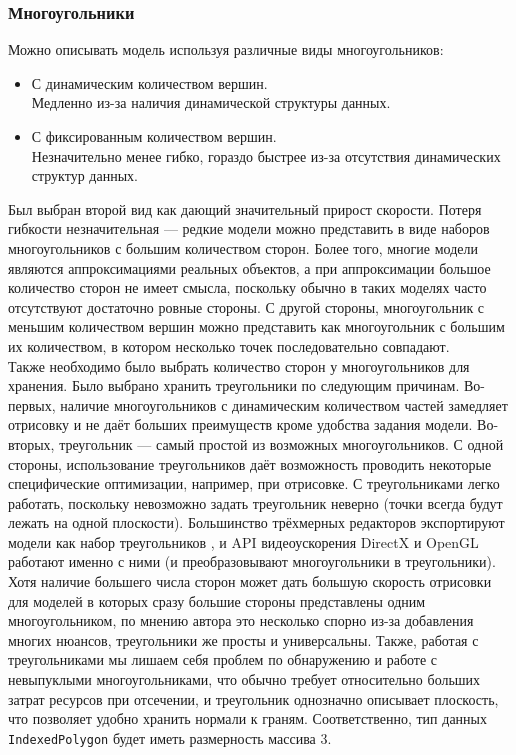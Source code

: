 \documentclass[a4paper,12pt]{report}
\numberwithin{equation}{section}
\begin{document}
\subsubsection{Многоугольники}
Можно описывать модель используя различные виды многоугольников:
\begin{itemize}
\item С динамическим количеством вершин. \\
Медленно из-за наличия динамической структуры данных.
\item С фиксированным количеством вершин. \\
Незначительно менее гибко, гораздо быстрее из-за отсутствия динамических структур данных.
\end{itemize}
Был выбран второй вид как дающий значительный прирост скорости. Потеря гибкости незначительная --- редкие модели можно представить в виде наборов многоугольников с большим количеством сторон. Более того, многие модели являются аппроксимациями реальных объектов, а при аппроксимации большое количество сторон не имеет смысла, поскольку обычно в таких моделях часто отсутствуют достаточно ровные стороны. С другой стороны, многоугольник с меньшим количеством вершин можно представить как многоугольник с большим их количеством, в котором несколько точек последовательно совпадают. \\
Также необходимо было выбрать количество сторон у многоугольников для хранения. Было выбрано хранить треугольники по следующим причинам. Во-первых, наличие многоугольников с динамическим количеством частей замедляет отрисовку и не даёт больших преимуществ кроме удобства задания модели. Во-вторых, треугольник --- самый простой из возможных многоугольников. С одной стороны, использование треугольников даёт возможность проводить некоторые специфические оптимизации, например, при отрисовке. С треугольниками легко работать, поскольку невозможно задать треугольник неверно (точки всегда будут лежать на одной плоскости). Большинство трёхмерных редакторов экспортируют модели как набор треугольников \cite{mayaguide}, и API видеоускорения DirectX \cite{luna2008introduction} и OpenGL \cite{richard2005opengl} работают именно с ними (и преобразовывают многоугольники в треугольники). Хотя наличие большего числа сторон может дать большую скорость отрисовки для моделей в которых сразу большие стороны представлены одним многоугольником, по мнению автора это несколько спорно из-за добавления многих нюансов, треугольники же просты и универсальны. Также, работая с треугольниками мы лишаем себя проблем по обнаружению и работе с невыпуклыми многоугольниками, что обычно требует относительно больших затрат ресурсов при отсечении, и треугольник однозначно описывает плоскость, что позволяет удобно хранить нормали к граням. Соответственно, тип данных \texttt{IndexedPolygon} будет иметь размерность массива 3.
\end{document}
